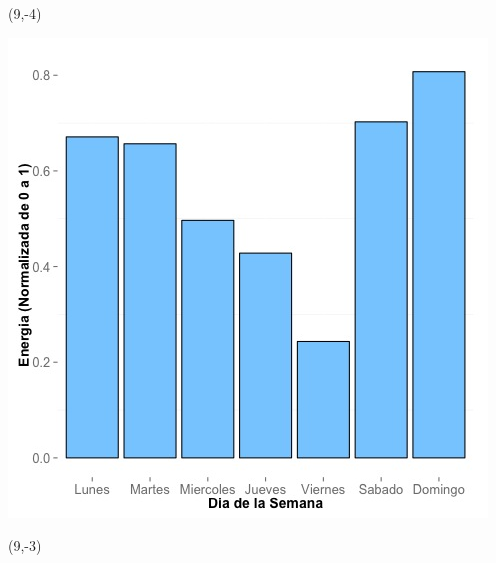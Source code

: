 \documentclass{article}\usepackage[]{graphicx}\usepackage[]{color}
\newenvironment{knitrout}{}{} %
\begin{document}
 \begin{textblock}{1}(9,-4)
\begin{minipage}{20em}
\begingroup

\endgroup
\end{minipage}
\end{textblock}


\begin{knitrout}
\color{fgcolor}
\includegraphics[scale=0.65]{figure/A23_day_of_week_plot} 
\end{knitrout}


 \begin{textblock}{1}(9,-3)
\begin{minipage}{20em}
\begingroup

\endgroup
\end{minipage}
\end{textblock}
\end{document}
